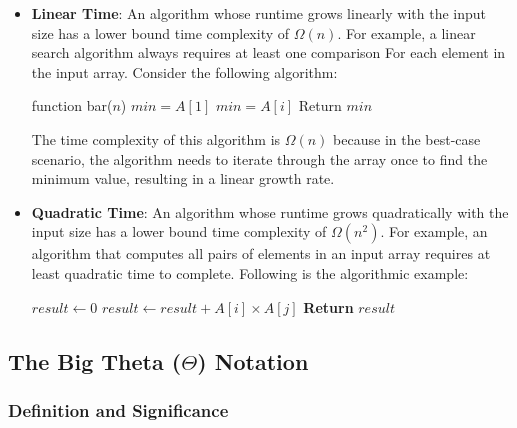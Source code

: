 \documentclass[12pt]{book} %
\begin{document}
\begin{itemize}
    \item \textbf{Linear Time}: An algorithm whose runtime grows linearly with the input size has a lower bound time complexity of $\Omega(n)$. For example, a linear search algorithm always requires at least one comparison For each element in the input array.
    \FloatBarrier
Consider the following algorithm:
\FloatBarrier
\begin{algorithm}[H]
\caption{Example Algorithm For Big Omega (\(\Omega\)) Notation}
\begin{algorithmic}
\State function bar($n$)
\State $min = A[1]$
\State $min = A[i]$
\EndIf
\EndFor
\State Return $min$
\end{algorithmic}
\end{algorithm}
\FloatBarrier
The time complexity of this algorithm is $\Omega(n)$ because in the best-case scenario, the algorithm needs to iterate through the array once to find the minimum value, resulting in a linear growth rate.
    
    \item \textbf{Quadratic Time}: An algorithm whose runtime grows quadratically with the input size has a lower bound time complexity of $\Omega(n^2)$. For example, an algorithm that computes all pairs of elements in an input array requires at least quadratic time to complete.
    \FloatBarrier
    Following is the algorithmic example:
    \FloatBarrier
    \begin{algorithm}
\caption{Quadratic Time Algorithm}
\begin{algorithmic}[1]
    \State $result \gets 0$
            \State $result \gets result + A[i] \times A[j]$
        \EndFor
    \EndFor
    \State \textbf{Return} $result$
\EndFunction
\end{algorithmic}
\end{algorithm}
\end{itemize}

\subsection{The Big Theta (\(\Theta\)) Notation}

\subsubsection{Definition and Significance}
\end{document}
